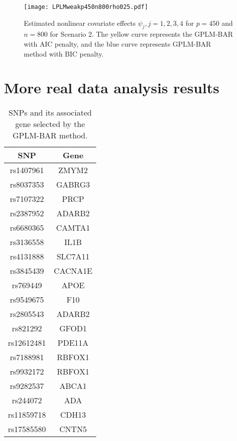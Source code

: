 \documentclass[11pt]{article}
\begin{document}
\begin{figure}[H]
\centering
\texttt{[image: LPLMweakp450n800rho025.pdf]}
\caption{Estimated nonlinear covariate effects $\psi_j, j=1,2,3,4$ for $p=450$ and $n=800$ for Scenario 2. The yellow curve represents the GPLM-BAR with AIC penalty, and the blue curve represents GPLM-BAR method with BIC penalty.}\label{ESTS2p450n800}
\end{figure}

\newpage
\section*{More real data analysis results}
\begin{table}[H]
\centering
\caption{SNPs and its associated gene selected by the GPLM-BAR method.} \label{SNPgene}
\begin{tabular}{c|c}
\hline
SNP & Gene \\
\hline
   rs1407961  & ZMYM2 \\
    rs8037353 & GABRG3 \\
    rs7107322 & PRCP \\
    rs2387952 & ADARB2 \\
    rs6680365 & CAMTA1 \\
    rs3136558 & IL1B \\
    rs4131888 & SLC7A11 \\
    rs3845439 & CACNA1E\\
    rs769449 & APOE \\
    rs9549675 & F10 \\
    rs2805543 & ADARB2 \\
    rs821292 & GFOD1 \\
    rs12612481 & PDE11A \\
    rs7188981 & RBFOX1  \\
    rs9932172 & RBFOX1 \\
    rs9282537 & ABCA1 \\
    rs244072 & ADA \\
    rs11859718 & CDH13 \\
    rs17585580 & CNTN5 \\
\hline
\end{tabular}
\end{table}

%
%
\end{document}
